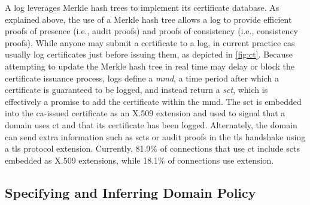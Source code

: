 A log leverages Merkle hash trees to implement its certificate database. As
explained above, the use of a Merkle hash tree allows a log to provide efficient
proofs of presence (i.e., audit proofs) and proofs of consistency (i.e.,
consistency proofs). While anyone may submit a certificate to a log, in current
practice \acp{ca} usually log certificates just before issuing them, as depicted
in \autoref{fig:ct}. Because attempting to update the Merkle hash tree in real
time may delay or block the certificate issuance process, logs define a
\emph{\ac{mmd}}, a time period after which a certificate is guaranteed to be
logged, and instead return a \emph{\ac{sct}}, which is effectively a promise to
add the certificate within the \ac{mmd}. The \ac{sct} is embedded into the
\ac{ca}-issued certificate as an X.509 extension and used to signal that a
domain uses \ac{ct} and that its certificate has been logged. Alternately, the
domain can send extra information such as \acp{sct} or audit proofs in the
\ac{tls} handshake using a \ac{tls} protocol extension. Currently, 81.9\% of
connections that use \ac{ct} include \acp{sct} embedded as X.509 extensions,
while 18.1\% of connections use  extension.



\subsection{Specifying and Inferring Domain Policy}
\label{sec:background:policy}

